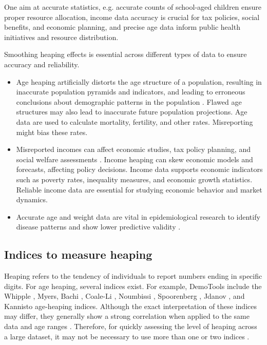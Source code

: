 \documentclass[pdflatex,sn-mathphys-num]{sn-jnl}%
\theoremstyle{thmstyleone}%
\theoremstyle{thmstyletwo}%
\theoremstyle{thmstylethree}%
\begin{document}
One aim at accurate statistics, e.g. accurate counts of school-aged children ensure proper resource allocation, income data accuracy is crucial for tax policies, social benefits, and economic planning, and precise age data inform public health initiatives and resource distribution.

Smoothing heaping effects is essential across different types of data to ensure accuracy and reliability. 


\begin{itemize}
    \item  
    Age heaping artificially distorts the age structure of a population, resulting in inaccurate population pyramids and indicators, and leading to erroneous conclusions about demographic patterns in the population \citep{un13}.
    Flawed age structures may also lead to inaccurate future population projections. Age data are used to calculate mortality, fertility, and other rates. Misreporting might bias these rates.
    \item Misreported incomes can affect economic studies, tax policy planning, and social welfare assessments \citep{seiver78}. Income heaping can skew economic models and forecasts, affecting policy decisions. Income data supports economic indicators such as poverty rates, inequality measures, and economic growth statistics. Reliable income data are essential for studying economic behavior and market dynamics. 
    \item Accurate age and weight data are vital in epidemiological research to identify disease patterns and show lower predictive validity \citep{stavrakantonaki17}.
\end{itemize}







\subsection{Indices to measure heaping}

Heaping refers to the tendency of individuals to report numbers ending in specific digits.
For age heaping, several indices exist. 
For example, DemoTools \citep{aburto2022} include the Whipple \citep{spoorenberg2007}, Myers, Bachi \citep{bachi1951}, Coale-Li \citep{coale1991}, Noumbissi \citep{noumbissi1992}, Spoorenberg \citep{spoorenberg2007}, Jdanov \citep{jdanov2008}, and Kannisto \citep{kannisto1999} age-heaping indices. Although the exact interpretation of these indices may differ, they generally show a strong correlation when applied to the same data and age ranges \citep{aburto2022}. Therefore, for quickly assessing the level of heaping across a large dataset, it may not be necessary to use more than one or two indices \citep{aburto2022}.
\end{document}
